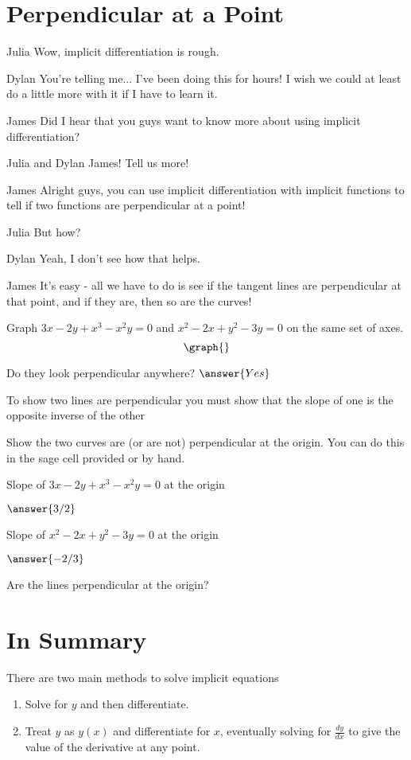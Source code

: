 \documentclass{ximera}
\begin{document}
\section{Perpendicular at a Point}
\begin{dialogue}
\item[Julia] Wow, implicit differentiation is rough.
\item[Dylan] You're telling me... I've been doing this for hours! I wish we could at least do a little more with it if I have to learn it.
\item[James] Did I hear that you guys want to know more about using implicit differentiation?
\item[Julia and Dylan] James! Tell us more!
\item[James] Alright guys, you can use implicit differentiation with implicit functions to tell if two functions are perpendicular at a point!
\item[Julia] But how?
\item[Dylan] Yeah, I don't see how that helps.
\item[James] It's easy - all we have to do is see if the tangent lines are perpendicular at that point, and if they are, then so are the curves!
\end{dialogue}
\begin{question}
Graph $3x - 2y + x^3-x^2y = 0$ and $x^2 - 2x + y^2 - 3y = 0$ on the same set of axes.
\[
\graph{}
\]

Do they look perpendicular anywhere?
$\answer{Yes}$
\end{question}
\begin{question}
\begin{hint}
To show two lines are perpendicular you must show that the slope of one is the opposite inverse of the other
\end{hint}
Show the two curves are (or are not) perpendicular at the origin. You can do this in the sage cell provided or by hand.
\begin{onlineOnly}
\begin{sageCell}

\end{sageCell}
\end{onlineOnly}
Slope of $3x - 2y + x^3-x^2y = 0$ at the origin 

$\answer{3/2}$

Slope of $x^2 - 2x + y^2 - 3y = 0$ at the origin 

$\answer{-2/3}$

Are the lines perpendicular at the origin?



\end{question}
\section{In Summary}
There are two main methods to solve implicit equations
\begin{enumerate}
\item{Solve for $y$ and then differentiate.}
\item{Treat $y$ as $y(x)$ and differentiate for $x$, eventually solving for $\frac{dy}{dx}$ to give the value of the derivative at any point.}
\end{enumerate}
\pagebreak
\end{document}
